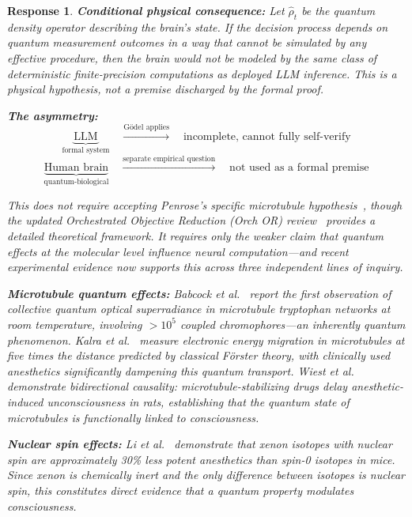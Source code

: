 \documentclass[11pt,a4paper]{article}
\newtheorem{response}{Response}
\begin{document}
\begin{response}
\textbf{Conditional physical consequence:} Let $\hat{\rho}_t$ be the quantum density operator describing the brain's state. If the decision process depends on quantum measurement outcomes in a way that cannot be simulated by any effective procedure, then the brain would not be modeled by the same class of deterministic finite-precision computations as deployed LLM inference. This is a physical hypothesis, not a premise discharged by the formal proof.

\textbf{The asymmetry:}
\begin{equation}
\underbrace{\text{LLM}}_{\text{formal system}} \quad \xrightarrow{\text{G\"{o}del applies}} \quad \text{incomplete, cannot fully self-verify}
\end{equation}
\begin{equation}
\underbrace{\text{Human brain}}_{\text{quantum-biological}} \quad \xrightarrow{\text{separate empirical question}} \quad \text{not used as a formal premise}
\end{equation}

This does not require accepting Penrose's specific microtubule hypothesis~\cite{penrose1994}, though the updated Orchestrated Objective Reduction (Orch OR) review~\cite{hameroff2014orchor} provides a detailed theoretical framework. It requires only the weaker claim that quantum effects at the molecular level influence neural computation---and recent experimental evidence now supports this across three independent lines of inquiry.

\textbf{Microtubule quantum effects:} Babcock et al.~\cite{babcock2024superradiance} report the first observation of collective quantum optical superradiance in microtubule tryptophan networks at room temperature, involving $>10^5$ coupled chromophores---an inherently quantum phenomenon. Kalra et al.~\cite{kalra2023exciton} measure electronic energy migration in microtubules at five times the distance predicted by classical F\"{o}rster theory, with clinically used anesthetics significantly dampening this quantum transport. Wiest et al.~\cite{wiest2024epothilone} demonstrate bidirectional causality: microtubule-stabilizing drugs delay anesthetic-induced unconsciousness in rats, establishing that the quantum state of microtubules is functionally linked to consciousness.

\textbf{Nuclear spin effects:} Li et al.~\cite{li2018xenon} demonstrate that xenon isotopes with nuclear spin are approximately 30\% less potent anesthetics than spin-0 isotopes in mice. Since xenon is chemically inert and the only difference between isotopes is nuclear spin, this constitutes direct evidence that a quantum property modulates consciousness.


\end{response}
\end{document}
